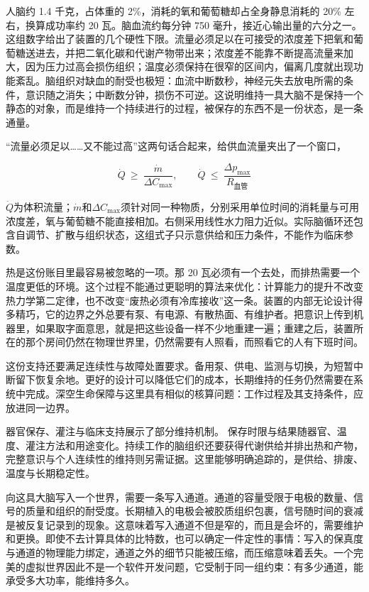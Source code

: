 
人脑约 1.4 千克，占体重的 2\%，消耗的氧和葡萄糖却占全身静息消耗的 20\% 左右，换算成功率约 20 瓦。脑血流约每分钟 750 毫升，接近心输出量的六分之一。这组数字给出了装置的几个硬性下限。流量必须足以在可接受的浓度差下把氧和葡萄糖送进去，并把二氧化碳和代谢产物带出来；浓度差不能靠不断提高流量来加大，因为压力过高会损伤组织；温度必须保持在很窄的区间内，偏离几度就出现功能紊乱。脑组织对缺血的耐受也极短：血流中断数秒，神经元失去放电所需的条件，意识随之消失；中断数分钟，损伤不可逆。这说明维持一具大脑不是保持一个静态的对象，而是维持一个持续进行的过程，被保存的东西不是一份状态，是一条通量。

“流量必须足以……又不能过高”这两句话合起来，给供血流量夹出了一个窗口，

\begin{equation}
\dot{Q}\ \ge\ \frac{\dot{m}}{\Delta C_{\max}},
\qquad
\dot{Q}\ \le\ \frac{\Delta p_{\max}}{R_{\text{血管}}}
\end{equation}

$\dot Q$为体积流量；$\dot m$和$\Delta C_{\max}$须针对同一种物质，分别采用单位时间的消耗量与可用浓度差，氧与葡萄糖不能直接相加。右侧采用线性水力阻力近似。实际脑循环还包含自调节、扩散与组织状态，这组式子只示意供给和压力条件，不能作为临床参数。

热是这份账目里最容易被忽略的一项。那 20 瓦必须有一个去处，而排热需要一个温度更低的环境。这个过程不能通过更聪明的算法来优化：计算能力的提升不改变热力学第二定律，也不改变“废热必须有冷库接收”这一条。装置的内部无论设计得多精巧，它的边界之外总要有泵、有电源、有散热面、有维护者。把意识上传到机器里，如果取字面意思，就是把这些设备一样不少地重建一遍；重建之后，装置所在的那个房间仍然在物理世界里，仍然需要有人照看，而照看它的人有下班时间。

这份支持还要满足连续性与故障处置要求。备用泵、供电、监测与切换，为短暂中断留下恢复余地。更好的设计可以降低它们的成本，长期维持的任务仍然需要在系统中完成。深空生命保障与这里具有相似的核算问题：工作过程及其支持条件，应放进同一边界。

器官保存、灌注与临床支持展示了部分维持机制。\cite{cameron2015organ} 保存时限与结果随器官、温度、灌注方法和用途变化。持续工作的脑组织还要获得代谢供给并排出热和产物，完整意识与个人连续性的维持则另需证据。这里能够明确追踪的，是供给、排废、温度与长期稳定性。


向这具大脑写入一个世界，需要一条写入通道。通道的容量受限于电极的数量、信号的质量和组织的耐受度。长期植入的电极会被胶质组织包裹，信号随时间的衰减是被反复记录到的现象\cite{polikov2005response}。这意味着写入通道不但是窄的，而且是会坏的，需要维护和更换。即使不去计算具体的比特数，也可以确定一件定性的事情：写入的保真度与通道的物理能力绑定，通道之外的细节只能被压缩，而压缩意味着丢失。一个完美的虚拟世界因此不是一个软件开发问题，它受制于同一组约束：有多少通道，能承受多大功率，能维持多久。

